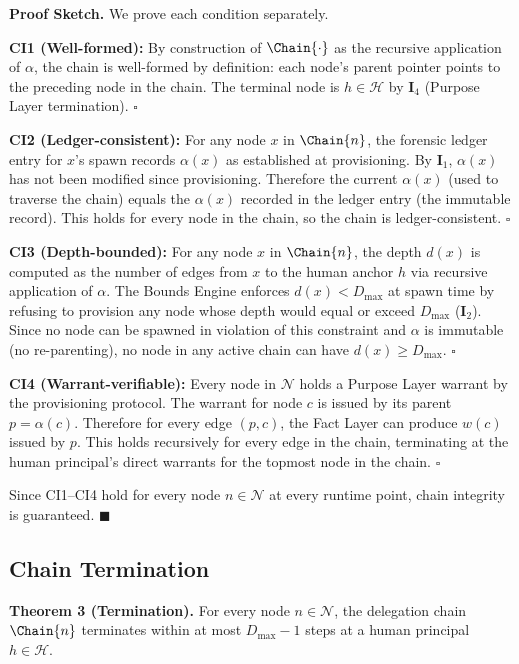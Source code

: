 \bigskip
\noindent\textbf{Proof Sketch.} We prove each condition separately.

\textbf{CI1 (Well-formed):} By construction of $\Chain{\cdot}$ as the recursive application of $\alpha$, the chain is well-formed by definition: each node's parent pointer points to the preceding node in the chain. The terminal node is $h \in \mathcal{H}$ by $\textbf{I}_4$ (Purpose Layer termination). $\square$

\textbf{CI2 (Ledger-consistent):} For any node $x$ in $\Chain{n}$, the forensic ledger entry for $x$'s spawn records $\alpha(x)$ as established at provisioning. By $\textbf{I}_1$, $\alpha(x)$ has not been modified since provisioning. Therefore the current $\alpha(x)$ (used to traverse the chain) equals the $\alpha(x)$ recorded in the ledger entry (the immutable record). This holds for every node in the chain, so the chain is ledger-consistent. $\square$

\textbf{CI3 (Depth-bounded):} For any node $x$ in $\Chain{n}$, the depth $d(x)$ is computed as the number of edges from $x$ to the human anchor $h$ via recursive application of $\alpha$. The Bounds Engine enforces $d(x) < D_{\max}$ at spawn time by refusing to provision any node whose depth would equal or exceed $D_{\max}$ ($\textbf{I}_2$). Since no node can be spawned in violation of this constraint and $\alpha$ is immutable (no re-parenting), no node in any active chain can have $d(x) \geq D_{\max}$. $\square$

\textbf{CI4 (Warrant-verifiable):} Every node in $\mathcal{N}$ holds a Purpose Layer warrant by the provisioning protocol. The warrant for node $c$ is issued by its parent $p = \alpha(c)$. Therefore for every edge $(p, c)$, the Fact Layer can produce $w(c)$ issued by $p$. This holds recursively for every edge in the chain, terminating at the human principal's direct warrants for the topmost node in the chain. $\square$

Since CI1–CI4 hold for every node $n \in \mathcal{N}$ at every runtime point, chain integrity is guaranteed. $\blacksquare$

\subsection{Chain Termination}
\label{sec:chain-termination}

\textbf{Theorem 3 (Termination).} For every node $n \in \mathcal{N}$, the delegation chain $\Chain{n}$ terminates within at most $D_{\max} - 1$ steps at a human principal $h \in \mathcal{H}$.


